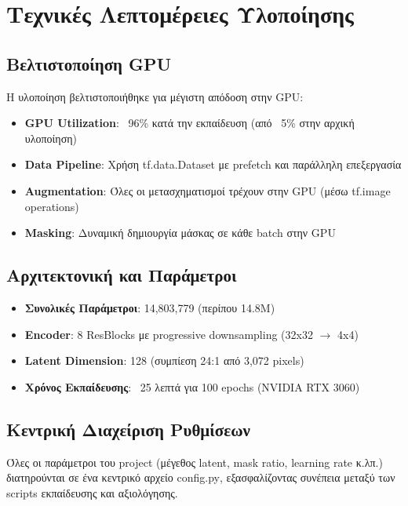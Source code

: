 \documentclass[11pt,a4paper]{article}
\begin{document}
\section{Τεχνικές Λεπτομέρειες Υλοποίησης}

\subsection{Βελτιστοποίηση GPU}
Η υλοποίηση βελτιστοποιήθηκε για μέγιστη απόδοση στην GPU:

\begin{itemize}
    \item \textbf{GPU Utilization}: ~96\% κατά την εκπαίδευση (από ~5\% στην αρχική υλοποίηση)
    \item \textbf{Data Pipeline}: Χρήση \textenglish{tf.data.Dataset} με \textenglish{prefetch} και παράλληλη επεξεργασία
    \item \textbf{Augmentation}: Όλες οι μετασχηματισμοί τρέχουν στην GPU (μέσω \textenglish{tf.image} operations)
    \item \textbf{Masking}: Δυναμική δημιουργία μάσκας σε κάθε batch στην GPU
\end{itemize}

\subsection{Αρχιτεκτονική και Παράμετροι}
\begin{itemize}
    \item \textbf{Συνολικές Παράμετροι}: 14,803,779 (περίπου 14.8M)
    \item \textbf{Encoder}: 8 ResBlocks με progressive downsampling (32x32 $\rightarrow$ 4x4)
    \item \textbf{Latent Dimension}: 128 (συμπίεση 24:1 από 3,072 pixels)
    \item \textbf{Χρόνος Εκπαίδευσης}: ~25 λεπτά για 100 epochs (NVIDIA RTX 3060)
\end{itemize}

\subsection{Κεντρική Διαχείριση Ρυθμίσεων}
Όλες οι παράμετροι του project (μέγεθος latent, mask ratio, learning rate κ.λπ.) διατηρούνται σε ένα κεντρικό αρχείο \textenglish{config.py}, εξασφαλίζοντας συνέπεια μεταξύ των scripts εκπαίδευσης και αξιολόγησης.

\newpage

\end{document}
